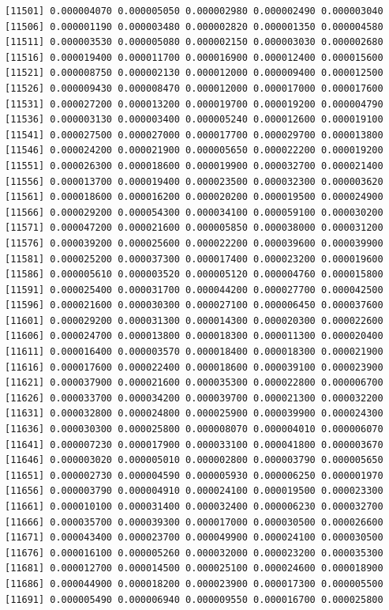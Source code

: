 \documentclass[]{article}
\begin{document}
\begin{verbatim}
[11501] 0.000004070 0.000005050 0.000002980 0.000002490 0.000003040
[11506] 0.000001190 0.000003480 0.000002820 0.000001350 0.000004580
[11511] 0.000003530 0.000005080 0.000002150 0.000003030 0.000002680
[11516] 0.000019400 0.000011700 0.000016900 0.000012400 0.000015600
[11521] 0.000008750 0.000002130 0.000012000 0.000009400 0.000012500
[11526] 0.000009430 0.000008470 0.000012000 0.000017000 0.000017600
[11531] 0.000027200 0.000013200 0.000019700 0.000019200 0.000004790
[11536] 0.000003130 0.000003400 0.000005240 0.000012600 0.000019100
[11541] 0.000027500 0.000027000 0.000017700 0.000029700 0.000013800
[11546] 0.000024200 0.000021900 0.000005650 0.000022200 0.000019200
[11551] 0.000026300 0.000018600 0.000019900 0.000032700 0.000021400
[11556] 0.000013700 0.000019400 0.000023500 0.000032300 0.000003620
[11561] 0.000018600 0.000016200 0.000020200 0.000019500 0.000024900
[11566] 0.000029200 0.000054300 0.000034100 0.000059100 0.000030200
[11571] 0.000047200 0.000021600 0.000005850 0.000038000 0.000031200
[11576] 0.000039200 0.000025600 0.000022200 0.000039600 0.000039900
[11581] 0.000025200 0.000037300 0.000017400 0.000023200 0.000019600
[11586] 0.000005610 0.000003520 0.000005120 0.000004760 0.000015800
[11591] 0.000025400 0.000031700 0.000044200 0.000027700 0.000042500
[11596] 0.000021600 0.000030300 0.000027100 0.000006450 0.000037600
[11601] 0.000029200 0.000031300 0.000014300 0.000020300 0.000022600
[11606] 0.000024700 0.000013800 0.000018300 0.000011300 0.000020400
[11611] 0.000016400 0.000003570 0.000018400 0.000018300 0.000021900
[11616] 0.000017600 0.000022400 0.000018600 0.000039100 0.000023900
[11621] 0.000037900 0.000021600 0.000035300 0.000022800 0.000006700
[11626] 0.000033700 0.000034200 0.000039700 0.000021300 0.000032200
[11631] 0.000032800 0.000024800 0.000025900 0.000039900 0.000024300
[11636] 0.000030300 0.000025800 0.000008070 0.000004010 0.000006070
[11641] 0.000007230 0.000017900 0.000033100 0.000041800 0.000003670
[11646] 0.000003020 0.000005010 0.000002800 0.000003790 0.000005650
[11651] 0.000002730 0.000004590 0.000005930 0.000006250 0.000001970
[11656] 0.000003790 0.000004910 0.000024100 0.000019500 0.000023300
[11661] 0.000010100 0.000031400 0.000032400 0.000006230 0.000032700
[11666] 0.000035700 0.000039300 0.000017000 0.000030500 0.000026600
[11671] 0.000043400 0.000023700 0.000049900 0.000024100 0.000030500
[11676] 0.000016100 0.000005260 0.000032000 0.000023200 0.000035300
[11681] 0.000012700 0.000014500 0.000025100 0.000024600 0.000018900
[11686] 0.000044900 0.000018200 0.000023900 0.000017300 0.000005500
[11691] 0.000005490 0.000006940 0.000009550 0.000016700 0.000025800

\end{verbatim}
\end{document}
